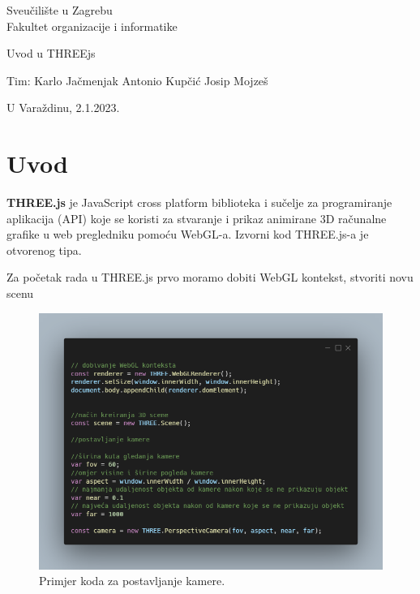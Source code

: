 \documentclass[a4paper,12pt]{article}
\begin{document}
\thispagestyle{empty}
\begin{center}
Sveučilište u Zagrebu\\
Fakultet organizacije i informatike
\end{center}
\vfill
\begin{center}
\Large Uvod u THREEjs
\end{center}
\vfill
\begin{flushright}
Tim: Karlo Jačmenjak \break
Antonio Kupčić \break
Josip Mojzeš \break
\end{flushright}
U Varaždinu, 2.1.2023. 

\newpage
\setcounter{page}{1}

\section{Uvod}
\textbf{THREE.js} je JavaScript cross platform biblioteka i sučelje za programiranje aplikacija (API) koje se koristi za stvaranje i prikaz animirane 3D računalne grafike u web pregledniku pomoću WebGL-a. Izvorni kod THREE.js-a je otvorenog tipa.

    Za početak rada u THREE.js prvo moramo dobiti WebGL kontekst, stvoriti novu scenu 


\begin{figure}[ht]
    \centering
    \includegraphics[scale=0.5]{image/zadatak1.png}
    \caption{Primjer koda za postavljanje kamere.}
\end{figure}
\end{document}
